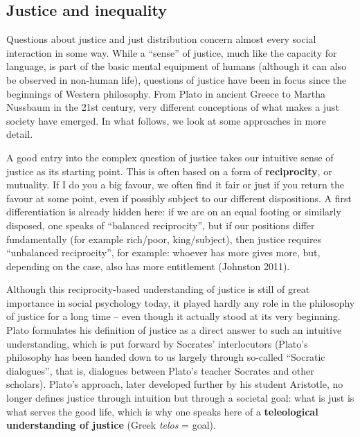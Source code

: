 \documentclass[
  british,
  a4paper,
  DIV=11,
  numbers=noendperiod,
  oneside,
  openany]{scrreprt}
\begin{document}
\subsection{Justice and inequality}\label{justice-and-inequality}

Questions about justice and just distribution concern almost every
social interaction in some way. While a ``sense'' of justice, much like
the capacity for language, is part of the basic mental equipment of
humans (although it can also be observed in non-human life), questions
of justice have been in focus since the beginnings of Western
philosophy. From Plato in ancient Greece to Martha Nussbaum in the 21st
century, very different conceptions of what makes a just society have
emerged. In what follows, we look at some approaches in more detail.

A good entry into the complex question of justice takes our intuitive
sense of justice as its starting point. This is often based on a form of
\textbf{reciprocity}, or mutuality. If I do you a big favour, we often
find it fair or just if you return the favour at some point, even if
possibly subject to our different dispositions. A first differentiation
is already hidden here: if we are on an equal footing or similarly
disposed, one speaks of ``balanced reciprocity'', but if our positions
differ fundamentally (for example rich/poor, king/subject), then justice
requires ``unbalanced reciprocity'', for example: whoever has more gives
more, but, depending on the case, also has more entitlement (Johnston
2011).

Although this reciprocity-based understanding of justice is still of
great importance in social psychology today, it played hardly any role
in the philosophy of justice for a long time -- even though it actually
stood at its very beginning. Plato formulates his definition of justice
as a direct answer to such an intuitive understanding, which is put
forward by Socrates' interlocutors (Plato's philosophy has been handed
down to us largely through so-called ``Socratic dialogues'', that is,
dialogues between Plato's teacher Socrates and other scholars). Plato's
approach, later developed further by his student Aristotle, no longer
defines justice through intuition but through a societal goal: what is
just is what serves the good life, which is why one speaks here of a
\textbf{teleological understanding of justice} (Greek \emph{telos} =
goal).
\end{document}
